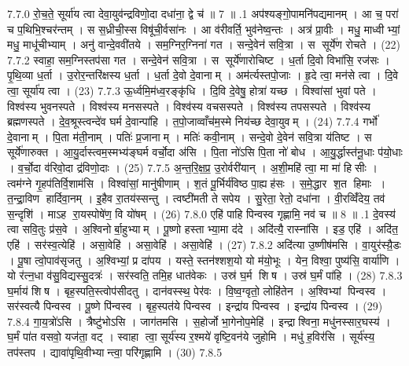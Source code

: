 7.7.0
रो॒च॒ते॒ सूर्या॑य त्वा देवा॒युव॑न्द्रविणो॒दा दधा॑ना॒ द्वे च॑ ॥ 7 ॥
.1
अप॑श्यङ्गो॒पामनि॑पद्यमानम् । आ च॒ परा॑ च प॒थिभि॒श्चर॑न्तम् । स स॒ध्रीची॒स्स विषू॑ची॒र्वसा॑नः । आ व॑रीवर्ति॒ भुव॑नेष्व॒न्तः । अत्र॑ प्रा॒वीः । मधु॒ माध्वीभ्यां॒ मधु॒ माधू॑चीभ्याम् । अनु॑ वान्दे॒ववी॑तये । सम॒ग्निर॒ग्निना॑ गत । सन्दे॒वेन॑ सवि॒त्रा । स सूर्ये॑ण रोचते । (22)
7.7.2
स्वाहा॒ सम॒ग्निस्तप॑सा गत । सन्दे॒वेन॑ सवि॒त्रा । स सूर्ये॑णारोचिष्ट । ध॒र्ता दि॒वो विभा॑सि॒ रज॑सः । पृ॒थि॒व्या ध॒र्ता । उ॒रोर॒न्तरि॑क्षस्य ध॒र्ता । ध॒र्ता दे॒वो दे॒वानाम् । अम॑र्त्यस्तपो॒जाः । हृ॒दे त्वा॒ मन॑से त्वा । दि॒वे त्वा॒ सूर्या॑य त्वा । (23)
7.7.3
ऊ॒र्ध्वमि॒म॑ध्व॒रङ्कृ॑धि । दि॒वि दे॒वेषु॒ होत्रा॑ यच्छ । विश्वा॑सां भुवां पते । विश्व॑स्य भुवनस्पते । विश्व॑स्य मनसस्पते । विश्व॑स्य वचसस्पते । विश्व॑स्य तपसस्पते । विश्व॑स्य ब्रह्मणस्पते । दे॒व॒श्रूस्त्वन्दे॑व घर्म दे॒वान्पा॑हि । त॒पो॒जाव्वाँच॑म॒स्मे निय॑च्छ देवा॒युवम् । (24)
7.7.4
गर्भो॑ दे॒वानाम् । पि॒ता म॑ती॒नाम् । पतिः॑ प्र॒जानाम् । मतिः॑ कवी॒नाम् । सन्दे॒वो दे॒वेन॑ सवि॒त्रा य॑तिष्ट । स सूर्ये॑णारुक्त । आ॒यु॒र्दास्त्वम॒स्मभ्य॑ङ्घर्म वर्चो॒दा अ॑सि । पि॒ता नो॑ऽसि पि॒ता नो॑ बोध । आ॒यु॒र्द्धास्त॑नू॒धाः प॑यो॒धाः । व॒र्चो॒दा व॑रिवो॒दा द्र॑विणो॒दाः । (25)
7.7.5
अ॒न्त॒रि॒क्ष॒प्र॒ उ॒रोर्वरी॑यान् । अ॒शी॒महि॑ त्वा॒ मा मा॑ हिसीः । त्वम॑ग्ने गृ॒हप॑तिर्वि॒शाम॑सि । विश्वा॑सां॒ मानु॑षीणाम् । श॒तं पू॒र्भिर्य॑विष्ठ पा॒ह्यह॑सः । स॒मे॒द्धार श॒त हिमाः । त॒न्द्रा॒विण हार्दिवा॒नम् । इ॒हैव रा॒तय॑स्सन्तु । त्वष्टी॑मती ते सपेय । सु॒रेता॒ रेतो॒ दधा॑ना । वी॒रव्विँ॑देय॒ तव॑ स॒न्दृशि॑ । माऽह रा॒यस्पोषे॑ण॒ वि यो॑षम् । (26)
7.8.0
एहि॑ पाहि पिन्वस्व गृह्णामि॒ नव॑ च ॥ 8 ॥
.1
दे॒वस्य॑ त्वा सवि॒तुः प्र॑स॒वे । अ॒श्विनोर्बा॒हुभ्याम् । पू॒ष्णो हस्ताभ्या॒मा द॑दे । अदि॑त्यै॒ रास्ना॑सि । इड॒ एहि॑ । अदि॑त॒ एहि॑ । सर॑स्व॒त्येहि॑ । असा॒वेहि॑ । असा॒वेहि॑ । असा॒वेहि॑ । (27)
7.8.2
अदि॑त्या उ॒ष्णीष॑मसि । वा॒युर॑स्यै़॒डः । पू॒षा त्वो॒पाव॑सृजतु । अ॒श्विभ्यां॒ प्र दा॑पय । यस्ते॒ स्तन॑श्शश॒यो यो म॑यो॒भूः । येन॒ विश्वा॒ पुष्य॑सि॒ वार्या॑णि । यो र॑त्न॒धा व॑सु॒विद्यस्सु॒दत्रः॑ । सर॑स्वति॒ तमि॒ह धात॑वेकः । उस्र॑ घ॒र्म शिष । उस्र॑ घ॒र्मं पा॑हि । (28)
7.8.3
घ॒र्माय॑ शिष । बृह॒स्पति॒स्त्वोप॑सीदतु । दान॑वस्स्थ॒ पेर॑वः । वि॒ष्व॒ग्वृतो॒ लोहि॑तेन । अ॒श्विभ्यां पिन्वस्व । सर॑स्वत्यै पिन्वस्व । पू॒ष्णे पि॑न्वस्व । बृह॒स्पत॑ये पिन्वस्व । इन्द्रा॑य पिन्वस्व । इन्द्रा॑य पिन्वस्व । (29)
7.8.4
गा॒य॒त्रो॑ऽसि । त्रैष्टु॑भोऽसि । जाग॑तमसि । स॒होर्जो भा॒गेनोप॒मेहि॑ । इन्द्राश्विना॒ मधु॑नस्सार॒घस्य॑ । घ॒र्मं पा॑त वसवो॒ यज॑ता॒ वट् । स्वाहा त्वा॒ सूर्य॑स्य र॒श्मये॑ वृष्टि॒वन॑ये जुहोमि । मधु॑ ह॒विर॑सि । सूर्य॑स्य॒ तप॑स्तप । द्यावा॑पृथि॒वीभ्यान्त्वा॒ परि॑गृह्णामि । (30)
7.8.5
